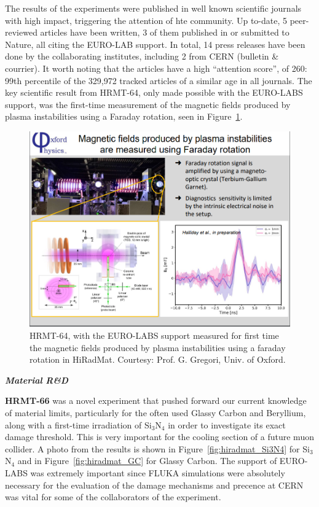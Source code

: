 The results of the experiments were published in well known scientific journals with high impact, triggering the attention of hte community. Up to-date, 5 peer-reviewed articles have been written, 3 of them published in or submitted to Nature, all citing the EURO-LAB support. In total, 14 press releases have been done by the collaborating institutes, including 2 from CERN (bulletin \& courrier). It worth noting that the articles have a high ``attention score'', of 260: 99th percentile of the 329,972 tracked articles of a similar age in all journals. The key scientific result from HRMT-64, only made possible with the EURO-LABS support, was the first-time measurement of the magnetic fields produced by plasma instabilities using a Faraday rotation, seen in Figure~\ref{fig:hiradmat_mag_field_plasma}.
\begin{figure}[H]
    \centering
    \includegraphics[width=0.75\linewidth]{graphics/HRMT_64_magnetic_field.png}
    \caption{HRMT-64, with the EURO-LABS support measured for first time the magnetic fields produced by plasma instabilities using a faraday rotation in HiRadMat. Courtesy: Prof. G. Gregori, Univ. of Oxford.}
    \label{fig:hiradmat_mag_field_plasma}
\end{figure}

\textbf{\textit{Material R\&D}} \mbox{}

\textbf{HRMT-66} was a novel experiment that pushed forward our current knowledge of material limits, particularly for the often used Glassy Carbon and Beryllium, along with a first-time irradiation of Si$_{3}$N$_{4}$ in order to investigate its exact damage threshold. This is very important for the cooling section of a future muon collider. A photo from the results is shown in Figure~\ref{fig:hiradmat_Si3N4} for Si$_{3}$N$_{4}$ and in Figure~\ref{fig:hiradmat_GC} for Glassy Carbon. The support of EURO-LABS was extremely important since FLUKA simulations were absolutely necessary for the evaluation of the damage mechanisms and precence at CERN was vital for some of the collaborators of the experiment.

